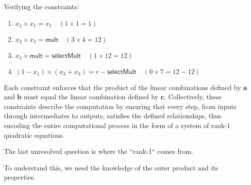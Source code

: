\documentclass[../lecture-notes.tex]{subfiles}
\begin{document}
\begin{example}
    Verifying the constraints:
    \begin{enumerate}
        \item \( x_1 \times x_1 = x_1 \quad (1 \times 1 = 1) \)
        \item \( x_2 \times x_3 = \mathsf{mult} \quad (3 \times 4 = 12) \)
        \item \( x_1 \times \mathsf{mult} = \mathsf{selectMult} \quad (1 \times 12 = 12) \)
        \item \( (1 - x_1) \times (x_2 + x_3) = r - \mathsf{selectMult} \quad (0 \times 7 = 12 - 12) \)
    \end{enumerate}
\end{example}

Each constraint enforces that the product of the linear combinations defined by $\mathbf{a}$ and $\mathbf{b}$ must
equal the linear combination defined by $\mathbf{c}$. Collectively, these constraints describe the 
computation by ensuring that every step, from inputs through intermediates to outputs, satisfies 
the defined relationships, thus encoding the entire computational process in the form of a system
of rank-1 quadratic equations.

The last unresolved question is where the ``rank-1`` comes from.

To understand this, we need the knowledge of the outer product and its properties.
\end{document}
